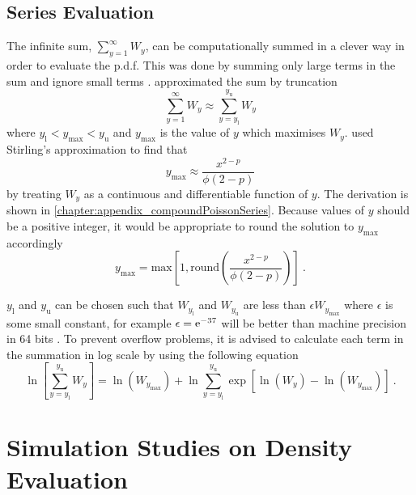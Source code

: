 \subsection{Series Evaluation}

The infinite sum, $\sum_{y=1}^\infty W_y$, can be computationally summed in a clever way in order to evaluate the p.d.f. This was done by summing only large terms in the sum and ignore small terms \citep{dunn2005series}. \cite{dunn2005series} approximated the sum by truncation
\begin{equation}
  \sum_{y=1}^\infty W_y \approx \sum_{y=y_\text{l}}^{y_\text{u}}W_y
\end{equation}
where $y_\text{l}<y_{\text{max}}<y_\text{u}$ and $y_{\text{max}}$ is the value of $y$ which maximises $W_y$. \cite{dunn2005series} used Stirling's approximation to find that
\begin{equation}
  y_{\text{max}} \approx \frac{x^{2-p}}{\phi(2-p)}
\end{equation}
by treating $W_y$ as a continuous and differentiable function of $y$. The derivation is shown in \ref{chapter:appendix_compoundPoissonSeries}. Because values of $y$ should be a positive integer, it would be appropriate to round the solution to $y_\text{max}$ accordingly
\begin{equation}
  y_{\text{max}} = \text{max}\left[
    1,\text{round}\left(\frac{x^{2-p}}{\phi(2-p)}\right)
  \right]
  \ .
\end{equation}

$y_\text{l}$ and $y_\text{u}$ can be chosen such that $W_{y_\text{l}}$ and $W_{y_\text{u}}$ are less than $\epsilon W_{y_\text{max}}$ where $\epsilon$ is some small constant, for example $\epsilon=\mathrm{e}^{-37}$ will be better than machine precision in 64 bits \citep{dunn2005series}. To prevent overflow problems, it is advised to calculate each term in the summation in log scale \citep{dunn2005series} by using the following equation
\begin{equation}
  \ln\left[
    \sum_{y=y_\text{l}}^{y_\text{u}}W_y
  \right]
  = 
  \ln\left(
    W_{y_\text{max}}
  \right)
  +\ln\sum_{y=y_\text{l}}^{y_\text{u}}
  \exp\left[
    \ln\left(W_y\right)-\ln\left(W_{y_\text{max}}\right)
  \right]
  \ .
\end{equation}

\section{Simulation Studies on Density Evaluation}

